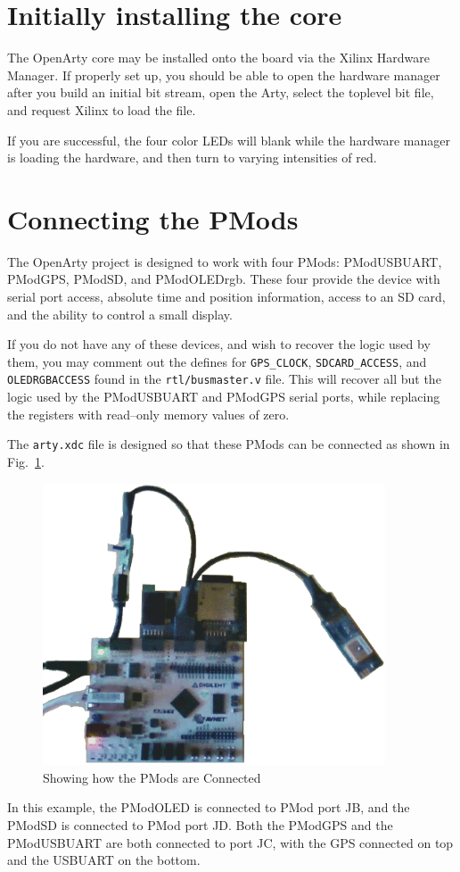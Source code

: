 \documentclass{gqtekspec}
\begin{document}
\section{Initially installing the core}
The OpenArty core may be installed onto the board via the Xilinx Hardware
Manager.  If properly set up, you should be able to open the hardware 
manager after you build an initial bit stream, open the Arty, select the
toplevel bit file, and request Xilinx to load the file.

If you are successful, the four color LEDs will blank while the hardware
manager is loading the hardware, and then turn to varying intensities of red.

\section{Connecting the PMods}
The OpenArty project is designed to work with four PMods: PModUSBUART,
PModGPS, PModSD, and PModOLEDrgb.  These four provide the device with
serial port access, absolute time and position information, access to an
SD card, and the ability to control a small display. 

If you do not have any of these devices, and wish to recover the logic used
by them, you may comment out the defines for {\tt GPS\_CLOCK},
{\tt SDCARD\_ACCESS}, and {\tt OLEDRGBACCESS} found in the {\tt rtl/busmaster.v}
file.  This will recover all but the logic used by the PModUSBUART and PModGPS
serial ports, while replacing the registers with read--only memory values of
zero.

The {\tt arty.xdc} file is designed so that these PMods can be connected as
shown in Fig.~\ref{fig:pmod-pic}.
\begin{figure}\begin{center}
\includegraphics[width=4in]{../gfx/openarty.eps}
\caption{Showing how the PMods are Connected}\label{fig:pmod-pic}
\end{center}\end{figure}
In this example, the PModOLED is connected to PMod port JB, and the PModSD is
connected to PMod port JD.  Both the PModGPS and the PModUSBUART are both
connected to port JC, with the GPS connected on top and the USBUART on the
bottom.
\end{document}
